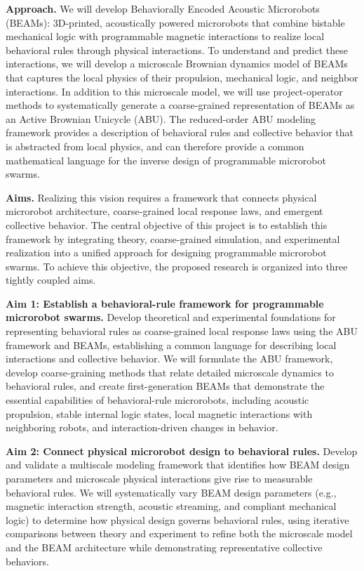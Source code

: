 \documentclass[11pt]{article}
\begin{document}
\textbf{Approach.} %
We will develop Behaviorally Encoded Acoustic Microrobots (BEAMs): 3D-printed, acoustically powered microrobots that combine bistable mechanical logic with programmable magnetic interactions to realize local behavioral rules through physical interactions.
To understand and predict these interactions, we will develop a microscale Brownian dynamics model of BEAMs that captures the local physics of their propulsion, mechanical logic, and neighbor interactions.
In addition to this microscale model, we will use project-operator methods to systematically generate a coarse-grained representation of BEAMs as an Active Brownian Unicycle (ABU).
The reduced-order ABU modeling framework provides a description of behavioral rules and collective behavior that is abstracted from local physics, and can therefore provide a common mathematical language for the inverse design of programmable microrobot swarms.

\textbf{Aims.} %
Realizing this vision requires a framework that connects physical microrobot architecture, coarse-grained local response laws, and emergent collective behavior.
The central objective of this project is to establish this framework by integrating theory, coarse-grained simulation, and experimental realization into a unified approach for designing programmable microrobot swarms. 
To achieve this objective, the proposed research is organized into three tightly coupled aims.

\textbf{Aim 1: Establish a behavioral-rule framework for programmable microrobot swarms.}
Develop theoretical and experimental foundations for representing behavioral rules as coarse-grained local response laws using the ABU framework and BEAMs, establishing a common language for describing local interactions and collective behavior.
We will formulate the ABU framework, develop coarse-graining methods that relate detailed microscale dynamics to behavioral rules, and create first-generation BEAMs that demonstrate the essential capabilities of behavioral-rule microrobots, including acoustic propulsion, stable internal logic states, local magnetic interactions with neighboring robots, and interaction-driven changes in behavior.

\textbf{Aim 2: Connect physical microrobot design to behavioral rules.}
Develop and validate a multiscale modeling framework that identifies how BEAM design parameters and microscale physical interactions give rise to measurable behavioral rules.
We will systematically vary BEAM design parameters (e.g., magnetic interaction strength, acoustic streaming, and compliant mechanical logic) to determine how physical design governs behavioral rules, using iterative comparisons between theory and experiment to refine both the microscale model and the BEAM architecture while demonstrating representative collective behaviors.
\end{document}
